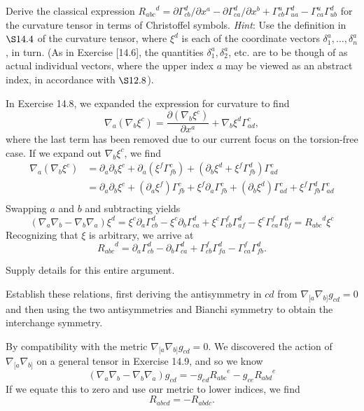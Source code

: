 \documentclass[../the-road-to-reality.tex]{subfiles}
\begin{document}
\begin{questions}
\question Derive the classical expression ${R_{abc}}^d =
  \partial\Gamma^d_{cb}/\partial{x}^a - \partial\Gamma^d_{ca}/\partial{x}^b +
  \Gamma^u_{cb}\Gamma^d_{ua} - \Gamma^u_{ca}\Gamma^d_{ub}$ for the curvature
  tensor in terms of Christoffel symbols. \textit{Hint}: Use the definition in
  $\S14.4$ of the curvature tensor, where $\xi^d$ is each of the coordinate
  vectors $\delta_1^a,\dots,\delta_n^a$, in turn. (As in Exercise [14.6], the
  quantities $\delta_1^a,\delta_2^a$, etc. are to be though of as actual
  individual vectors, where the upper index $a$ may be viewed as an abstract
  index, in accordance with $\S12.8$).

  \begin{solution}
    In Exercise 14.8, we expanded the expression for curvature to find
    \[
      \nabla_a(\nabla_b\xi^c) = \frac{\partial(\nabla_b\xi^c)}{\partial{x^a}} + \nabla_b\xi^d\Gamma^c_{ad},
    \]
    where the last term has been removed due to our current focus on the
    torsion-free case. If we expand out $\nabla_b\xi^c$, we find
    \begin{align*}
      \nabla_a(\nabla_b\xi^c) &= \partial_a\partial_b\xi^c + \partial_a(\xi^f\Gamma^c_{fb}) + (\partial_b\xi^d + \xi^f\Gamma^d_{fb})\Gamma^c_{ad} \\
      &= \partial_a\partial_b\xi^c + (\partial_a\xi^f)\Gamma^c_{fb} + \xi^f\partial_a\Gamma^c_{fb} + (\partial_b\xi^d)\Gamma^c_{ad} + \xi^f\Gamma^d_{fb}\Gamma^c_{ad} \\
    \end{align*}
    Swapping $a$ and $b$ and subtracting yields
    \[
      (\nabla_a\nabla_b - \nabla_b\nabla_a)\xi^d = \xi^c\partial_a\Gamma^d_{cb}
      - \xi^c\partial_b\Gamma^d_{ca} + \xi^c\Gamma^f_{cb}\Gamma^d_{af} -
      \xi^c\Gamma^f_{ca}\Gamma^d_{bf} = {R_{abc}}^d\xi^c
    \]
    Recognizing that $\xi$ is arbitrary, we arrive at
    \[
      {R_{abc}}^d = \partial_a\Gamma^d_{cb} - \partial_b\Gamma^d_{ca} +
      \Gamma^f_{cb}\Gamma^d_{fa} - \Gamma^f_{ca}\Gamma^d_{fb}.
    \]
  \end{solution}

\question Supply details for this entire argument.

\question Establish these relations, first deriving the antisymmetry in $cd$
  from $\nabla_{[a}\nabla_{b]}g_{cd} = 0$ and then using the two antisymmetries
  and Bianchi symmetry to obtain the interchange symmetry.

  \begin{solution}
    By compatibility with the metric $\nabla_{[a}\nabla_{b]}g_{cd} = 0$. We
    discovered the action of $\nabla_{[a}\nabla_{b]}$ on a general tensor in
    Exercise 14.9, and so we know
    \[
      (\nabla_a\nabla_b - \nabla_b\nabla_a)g_{cd} = -g_{ed}{R_{abc}}^e - g_{ce}{R_{abd}}^e
    \]
    If we equate this to zero and use our metric to lower indices, we find
    \[
      R_{abcd} = -R_{abdc}.
    \]
  \end{solution}


\end{questions}
\end{document}
